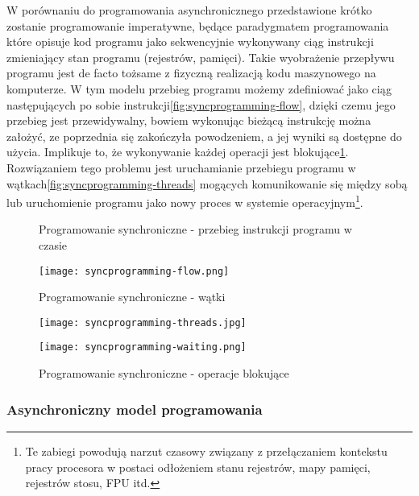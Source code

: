 W porównaniu do programowania asynchronicznego przedstawione krótko zostanie programowanie imperatywne, będące paradygmatem programowania\cite{programming-paradigms} które opisuje kod programu jako sekwencyjnie wykonywany ciąg instrukcji zmieniający stan programu (rejestrów, pamięci). Takie wyobrażenie przepływu programu jest de facto tożsame z fizyczną realizacją kodu maszynowego na komputerze. W tym modelu przebieg programu możemy zdefiniować jako ciąg następujących po sobie instrukcji\ref{fig:syncprogramming-flow}, dzięki czemu jego przebieg jest przewidywalny, bowiem wykonując bieżącą instrukcję można założyć, ze poprzednia się zakończyła powodzeniem, a jej wyniki są dostępne do użycia. Implikuje to, że wykonywanie każdej operacji jest blokujące\ref{fig:syncprogramming-waiting}. Rozwiązaniem tego problemu jest uruchamianie przebiegu programu w wątkach\ref{fig:syncprogramming-threads} mogących komunikowanie się między sobą lub uruchomienie programu jako nowy proces w systemie operacyjnym\footnote{Te zabiegi powodują narzut czasowy związany z przełączaniem kontekstu pracy procesora w postaci odłożeniem stanu rejestrów, mapy pamięci, rejestrów stosu, FPU itd.}.

\begin{figure}[ht]
\centering
\begin{minipage}[b]{0.45\linewidth}
  \label{fig:syncprogramming-flow}
  \caption[Programowanie synchroniczne - przebieg instrukcji programu w czasie]{Programowanie synchroniczne - przebieg instrukcji programu w czasie}
  \centering
    \texttt{[image: syncprogramming-flow.png]}
\end{minipage}

\begin{minipage}[b]{0.45\linewidth}
\label{fig:syncprogramming-threads}
  \caption[Programowanie synchroniczne - wątki]{Programowanie synchroniczne - wątki}
  \centering
    \texttt{[image: syncprogramming-threads.jpg]}
\end{minipage}

\begin{minipage}[b]{0.45\linewidth}
\label{fig:syncprogramming-waiting}
  \caption[Programowanie synchroniczne - operacje blokujące]{Programowanie synchroniczne - operacje blokujące}
  \centering
    \texttt{[image: syncprogramming-waiting.png]}
\end{minipage}
\end{figure}

\subsubsection{Asynchroniczny model programowania}
\label{subsub:asyncprogramming}

